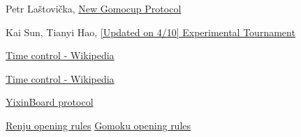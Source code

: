 \documentclass[12pt,a4paper]{article}
\begin{document}
\begin{thebibliography}{99}
Petr Laštovička, \href{http://petr.lastovicka.sweb.cz/protocl2en.htm}{New Gomocup Protocol}

Kai Sun, Tianyi Hao, \href{https://gomocup.org/news/experimental-tournament-update-2020/}{[Updated on 4/10] Experimental Tournament}

\href{https://en.wikipedia.org/wiki/Time_control#Increment_and_delay_methods}{Time control - Wikipedia}

\href{https://en.wikipedia.org/wiki/Time_control#Sudden_death}{Time control - Wikipedia}

\href{https://github.com/accreator/Yixin-protocol/blob/master/protocol.pdf}{YixinBoard protocol}

\href{https://www.renju.net/rule/}{Renju opening rules}
\href{http://gomokuworld.com/gomoku/2}{Gomoku opening rules}

\end{thebibliography}
\end{document}
